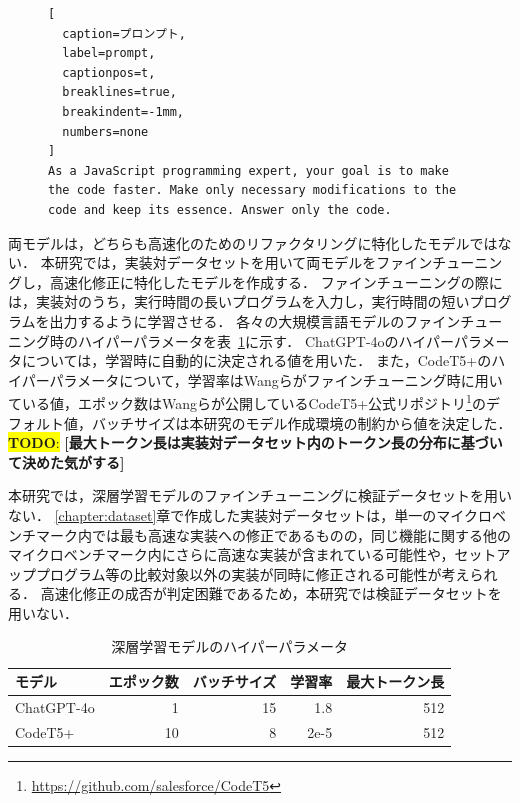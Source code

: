 \documentclass[11pt]{jreport}
\newcommand{\todo}[1]{\colorbox{yellow}{{\bf TODO}:}{\color{red} {\textbf{[#1]}}}}
\begin{document}
\begin{figure}[t]
\captionsetup{name=Listing}
\hspace{0.04\columnwidth}
\begin{minipage}[b]{0.96\linewidth}
\begin{lstlisting}[
  caption=プロンプト,
  label=prompt,
  captionpos=t,
  breaklines=true,
  breakindent=-1mm,
  numbers=none
]
As a JavaScript programming expert, your goal is to make the code faster. Make only necessary modifications to the code and keep its essence. Answer only the code.
\end{lstlisting}
\end{minipage}
\end{figure}


両モデルは，どちらも高速化のためのリファクタリングに特化したモデルではない．
本研究では，実装対データセットを用いて両モデルをファインチューニングし，高速化修正に特化したモデルを作成する．
ファインチューニングの際には，実装対のうち，実行時間の長いプログラムを入力し，実行時間の短いプログラムを出力するように学習させる．
各々の大規模言語モデルのファインチューニング時のハイパーパラメータを表~\ref{table:model:params}に示す．
ChatGPT-4oのハイパーパラメータについては，学習時に自動的に決定される値を用いた．
また，CodeT5+のハイパーパラメータについて，学習率はWangら\cite{Wang_2023}がファインチューニング時に用いている値，エポック数はWangらが公開しているCodeT5+公式リポジトリ\footnote{\url{https://github.com/salesforce/CodeT5}}のデフォルト値，バッチサイズは本研究のモデル作成環境の制約から値を決定した．
\todo{最大トークン長は実装対データセット内のトークン長の分布に基づいて決めた気がする}

本研究では，深層学習モデルのファインチューニングに検証データセットを用いない．
\ref{chapter:dataset}章で作成した実装対データセットは，単一のマイクロベンチマーク内では最も高速な実装への修正であるものの，同じ機能に関する他のマイクロベンチマーク内にさらに高速な実装が含まれている可能性や，セットアッププログラム等の比較対象以外の実装が同時に修正される可能性が考えられる．
高速化修正の成否が判定困難であるため，本研究では検証データセットを用いない．




\begin{table}[t]
\caption{深層学習モデルのハイパーパラメータ}
\label{table:model:params}
\centering
\begin{tabular}{lrrrr}
\hline
モデル & エポック数 & バッチサイズ & 学習率 & 最大トークン長 \\
\hline
ChatGPT-4o & 1 & 15 & 1.8 & 512 \\
CodeT5+ & 10 & 8 & 2e-5 & 512 \\
\hline
\end{tabular}
\end{table}
\end{document}
